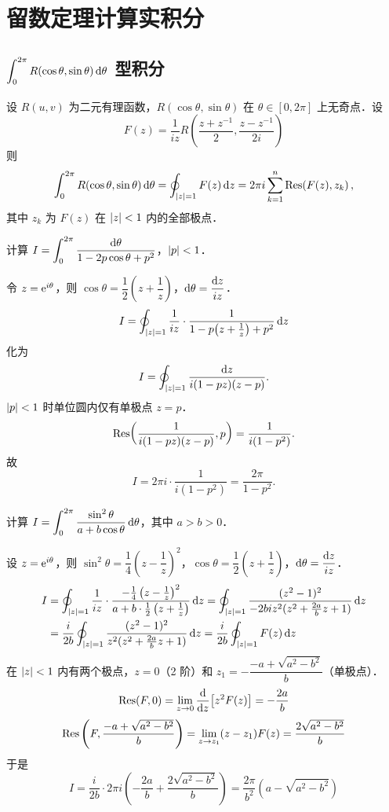 \documentclass[12pt, a4paper, oneside, UTF8]{ctexbook}
\begin{document}
\section{留数定理计算实积分}

\subsection{$\displaystyle\int_0^{2\pi} R(\cos\theta,\sin\theta)\,\mathrm{d}\theta$ 型积分}

\begin{theorem}[三角有理积分]
设 $R(u,v)$ 为二元有理函数，$R(\cos\theta,\sin\theta)$ 在 $\theta\in[0,2\pi]$ 上无奇点．设
\[F(z)=\frac{1}{iz}R\left(\frac{z+z^{-1}}{2},\frac{z-z^{-1}}{2i}\right)\]
则
\[
\int_0^{2\pi} R(\cos\theta,\sin\theta)\,\d\theta =\oint_{\abs{z}=1} F(z)\,\d z = 2\pi i\sum_{k=1}^{n}\Res\!\left(F(z),z_k\right),
\]
其中 $z_k$ 为 $F(z)$ 在 $\abs{z}<1$ 内的全部极点．
\end{theorem}

\begin{example}
计算 $\displaystyle I = \int_0^{2\pi}\frac{\mathrm{d}\theta}{1-2p\cos\theta + p^2}$，$\abs{p}<1$．
\end{example}
\begin{solution}
令 $z = \mathrm{e}^{i\theta}$，则 $\cos\theta = \dfrac{1}{2}\!\left(z+\dfrac{1}{z}\right)$，$\mathrm{d}\theta = \dfrac{\mathrm{d} z}{iz}$．
\[
I = \oint_{\abs{z}=1}\frac{1}{iz}\cdot \frac{1}{1-p\!\left(z+\frac{1}{z}\right)+p^2}\,\mathrm{d} z
\]
化为
\[
I = \oint_{\abs{z}=1}\frac{\mathrm{d} z}{i(1-pz)(z-p)}.
\]
$\abs{p}<1$ 时单位圆内仅有单极点 $z=p$．
\[
\Res\!\left(\frac{1}{i(1-pz)(z-p)},p\right) = \frac{1}{i(1-p^2)}.
\]
故
\[
I = 2\pi i \cdot \frac{1}{i(1-p^2)} = \frac{2\pi}{1-p^2}.
\]
\end{solution}

\begin{example}
    计算 $I=\displaystyle\int_0^{2\pi}\frac{\sin^2\theta}{a+b\cos\theta}\,\mathrm{d}\theta$，其中 $a>b>0$．
\end{example}
\begin{solution}
    设 $z = \mathrm{e}^{i\theta}$，则 $\sin^2\theta = \dfrac{1}{4}\!\left(z-\dfrac{1}{z}\right)^2$，$\cos\theta = \dfrac{1}{2}\!\left(z+\dfrac{1}{z}\right)$，$\mathrm{d}\theta = \dfrac{\mathrm{d} z}{iz}$．
    \begin{align*}
        I &= \oint_{\abs{z}=1}\frac{1}{iz}\cdot \frac{-\frac{1}{4}\left(z-\frac{1}{z}\right)^2}{a+b\cdot\frac{1}{2}\left(z+\frac{1}{z}\right)}\,\mathrm{d} z
        = \oint_{\abs{z}=1}\frac{(z^2-1)^2}{-2biz^2(z^2+\frac{2a}{b}z+1)}\,\mathrm{d} z\\
        &= \frac{i}{2b}\oint_{\abs{z}=1}\frac{(z^2-1)^2}{z^2(z^2+\frac{2a}{b}z+1)}\,\mathrm{d} z = \frac{i}{2b}\oint_{\abs{z}=1}F(z)\,\mathrm{d} z
    \end{align*}
    在 $\abs{z}<1$ 内有两个极点，$z=0$（2 阶）和 $z_1=-\dfrac{-a+\sqrt{a^2-b^2}}{b}$（单极点）．
    \[\Res(F, 0)=\lim_{z\to 0}\frac{\d}{\d z}\bigl[z^2F(z)\bigr]=-\frac{2a}{b}\]
    \[\Res\left(F, \frac{-a+\sqrt{a^2-b^2}}{b}\right)=\lim_{z\to z_1}(z-z_1)F(z)=\frac{2\sqrt{a^2-b^2}}{b}\]
    于是
    \[I = \frac{i}{2b}\cdot 2\pi i\left(-\frac{2a}{b} + \frac{2\sqrt{a^2-b^2}}{b}\right) = \frac{2\pi}{b^2}\left(a-\sqrt{a^2-b^2}\right)\]
\end{solution}
\end{document}
